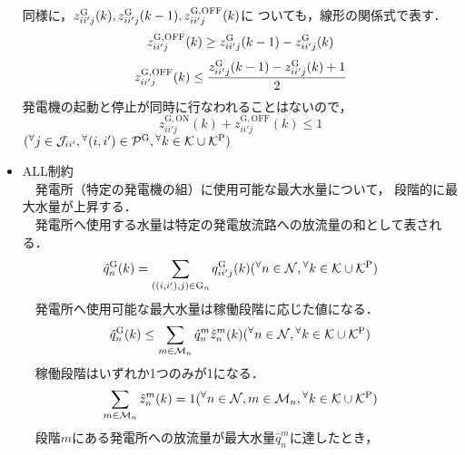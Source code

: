 \begin{itemize}
%
		同様に，$z^{\rm G}_{ii'j}(k),z^{\rm G}_{ii'j}(k-1),z_{ii'j}^{\mathrm {G,OFF}} (k)$に%
		ついても，線形の関係式で表す．
		\begin{equation}
			z_{ii'j}^{\mathrm {G,OFF}} (k) \geq z^{\rm G}_{ii'j}(k-1) - z^{\rm G}_{ii'j}(k)
		\end{equation}	
%		
		\begin{equation}
			z_{ii'j}^{\mathrm {G,OFF}} (k) \leq %
			\frac{z^{\rm G}_{ii'j}(k-1) - z^{\rm G}_{ii'j}(k)+1}{2}
		\end{equation}
%
		発電機の起動と停止が同時に行なわれることはないので，	
%
		\begin{equation}
			z_{ii'j}^{\mathrm {G,ON}} (k) + z_{ii'j}^{\mathrm {G,OFF}} (k) \leq 1%
		\end{equation}
%		
		\hspace{6.3cm}
		$ ({}^{\forall} j \in \mathcal{J}_{ii'} , %
		 {}^\forall(i,i') \in \mathcal{P}^{\rm G} , {}^{\forall} k \in \mathcal{K} %
		 \cup \mathcal{K}^{\rm P}) $
%
	\item
		ALL制約 \\
		　発電所（特定の発電機の組）に使用可能な最大水量について，%
		段階的に最大水量が上昇する．\\%
%
		　発電所へ使用する水量は特定の発電放流路への放流量の和として表される．
%
		\begin{equation}
			\label{all1}
			\hat{q}^{\mathrm G}_{n} (k) = \sum_{( (i,i'),j) \in \mathrm {G}_{n}} %
			q^{\mathrm G}_{ii'j} (k)
			\hfill ({}^{\forall} n \in \mathcal{N} , {}^{\forall} k \in \mathcal{K}%
			\cup \mathcal{K}^{\rm P}) 			
		\end{equation}
%
		　発電所へ使用可能な最大水量は稼働段階に応じた値になる．
%			
		\begin{equation}
			\label{all2}
			\hat{q}^{\mathrm G}_{n} (k) \leq 
			\sum_{m \in \mathcal{M}_{n}} \hat{q}^{m}_{n}%
			\hat{z}^{m}_{n} (k)
			\hfill ({}^{\forall} n \in \mathcal{N} , %
			{}^{\forall} k \in \mathcal{K} \cup \mathcal{K}^{\rm P}) 			
		\end{equation}
%
		　稼働段階はいずれか1つのみが1になる．		
%		
		\begin{equation}
			\label{all3}
			\sum_{m \in \mathcal{M}_{n}} \hat{z}^{m}_{n} (k) = 1 
			\hfill ({}^{\forall} n \in \mathcal{N} , m \in \mathcal{M}_{n} , 
			{}^{\forall} k \in \mathcal{K} \cup \mathcal{K}^{\rm P}) 
		\end{equation}
%
		　段階$m$にある発電所への放流量が最大水量$\hat{q}^{m}_{n}$に達したとき，%

\end{itemize}
